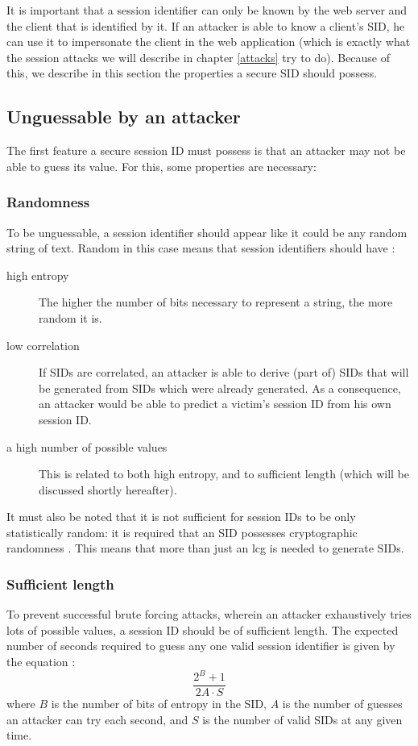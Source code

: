 It is important that a session identifier can only be known by the web server and the client that is identified by it. If an attacker is able to know a client's SID, he can use it to impersonate the client in the web application (which is exactly what the session attacks we will describe in chapter \ref{attacks} try to do). Because of this, we describe in this section the properties a secure SID should possess.

\subsection{Unguessable by an attacker}

The first feature a secure session ID must possess is that an attacker may not be able to guess its value. For this, some properties are necessary:

\subsubsection{Randomness}
To be unguessable, a session identifier should appear like it could be any random string of text. Random in this case means that session identifiers should have \cite{Nikiforakis2010, Farrell2011, rfc4086}:
\begin{description}
	\item[high entropy] The higher the number of bits necessary to represent a string, the more random it is.
	\item[low correlation] If SIDs are correlated, an attacker is able to derive (part of) SIDs that will be generated from SIDs which were already generated. As a consequence, an attacker would be able to predict a victim's session ID from his own session ID.
	\item[a high number of possible values] This is related to both high entropy, and to sufficient length (which will be discussed shortly hereafter).
\end{description}
It must also be noted that it is not sufficient for session IDs to be only statistically random: it is required that an SID possesses cryptographic randomness \cite{Fu2001}. This means that more than just an \gls{lcg} %
is needed to generate SIDs.

\subsubsection{Sufficient length}
To prevent successful brute forcing attacks, wherein an attacker exhaustively tries lots of possible values, a session ID should be of sufficient length. The expected number of seconds required to guess any one valid session identifier is given by the equation \cite{OWASP2009a}:
\[
	\frac{2^B + 1}{2A \cdot S}
\]
where $B$ is the number of bits of entropy in the SID, $A$ is the number of guesses an attacker can try each second, and $S$ is the number of valid SIDs at any given time.

